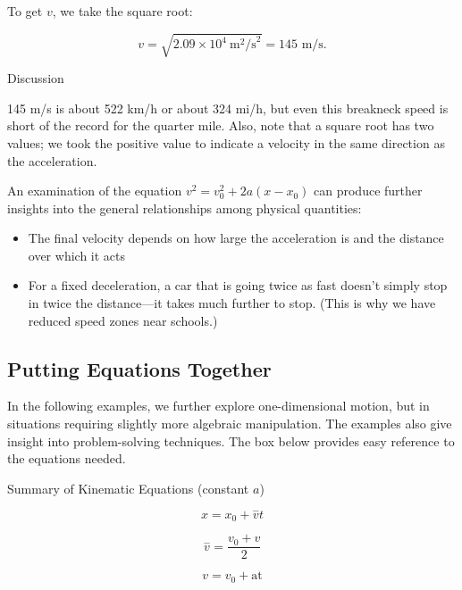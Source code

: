 \documentclass[
]{book}
\providecommand{\tightlist}{%
  \setlength{\itemsep}{0pt}\setlength{\parskip}{0pt}}
\begin{document}
To get \(v{}\), we take the square root:

\leavevmode{}%
\[{{v = \sqrt{2\text{.}{\text{09} \times \text{10}^{4}}\ \text{m}^{2}\text{/s}^{2}}} = \text{145\ m/s}}.\]

{Discussion}

145 m/s is about 522 km/h or about 324 mi/h, but even this breakneck
speed is short of the record for the quarter mile. Also, note that a
square root has two values; we took the positive value to indicate a
velocity in the same direction as the acceleration.

An examination of the equation
\({{v^{2} = {v_{0}^{2} + 2a}}({x - x_{0}})}{}\) can produce further
insights into the general relationships among physical quantities:

\begin{itemize}
\tightlist
\item
  \protect\hypertarget{import-auto-id1680053}{}{The final velocity depends on how large the acceleration is and the
  distance over which it acts}
\item
  \protect\hypertarget{import-auto-id1680020}{}{For a fixed deceleration, a car that is going twice as fast
  doesn't simply stop in twice the distance---it takes much further
  to stop. (This is why we have reduced speed zones near
  schools.)}
\end{itemize}

\hypertarget{fs-id1164906446591}{}
\hypertarget{putting-equations-together}{%
\subsection{Putting Equations Together}\label{putting-equations-together}}

In the following examples, we further explore one-dimensional motion,
but in situations requiring slightly more algebraic manipulation. The
examples also give insight into problem-solving techniques. The box
below provides easy reference to the equations needed.

\hypertarget{fs-id1164906460309}{}
Summary of Kinematic Equations (constant \(a{}\))

\leavevmode{}%
\[{{x =}x_{0}{+}\overset{-}{v}t}{}\]

\leavevmode{}%
\[{{\overset{-}{v} =}\frac{v_{0} + v}{2}}{}\]

\leavevmode{}%
\[{v = {v_{0} + \text{at}}}{}\]
\end{document}
